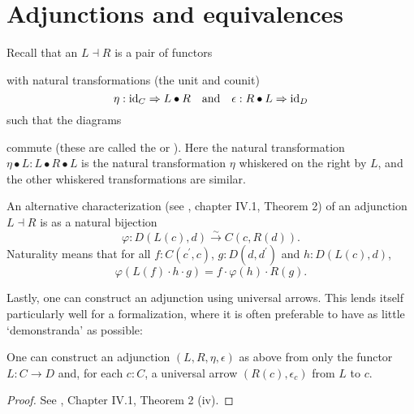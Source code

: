 \section{Adjunctions and equivalences}

Recall that an  $ L \dashv R $ is a pair of functors
\begin{center}
\end{center}
with natural transformations (the unit and counit)
\[ \eta: \text{id}_{C} \Rightarrow L \bullet R \quad \text{and} \quad \epsilon: R \bullet L \Rightarrow \text{id}_{D} \]
such that the diagrams
\begin{center}
  \qquad
\end{center}
commute (these are called the  or ). Here the natural transformation $ \eta \bullet L: L \bullet R \bullet L $ is the natural transformation $ \eta $ whiskered on the right by $ L $, and the other whiskered transformations are similar.

An alternative characterization (see \autocite{MacLane}, chapter IV.1, Theorem 2) of an adjunction $ L \dashv R $ is as a natural bijection
\[ \varphi: D(L(c), d) \xrightarrow{\sim} C(c, R(d)). \]
Naturality means that for all $ f: C(c^\prime, c) $, $ g: D(d, d^\prime) $ and $ h: D(L(c), d) $,
\[ \varphi(L(f) \cdot h \cdot g) = f \cdot \varphi(h) \cdot R(g). \]

Lastly, one can construct an adjunction using universal arrows. This lends itself particularly well for a formalization, where it is often preferable to have as little `demonstranda' as possible:
\begin{lemma}
  One can construct an adjunction $ (L, R, \eta, \epsilon) $ as above from only the functor $ L: C \to D $ and, for each $ c: C $, a universal arrow $ (R(c), \epsilon_c) $ from $ L $ to $ c $.
\end{lemma}
\begin{proof}
  See \autocite{MacLane}, Chapter IV.1, Theorem 2 (iv).
\end{proof}

